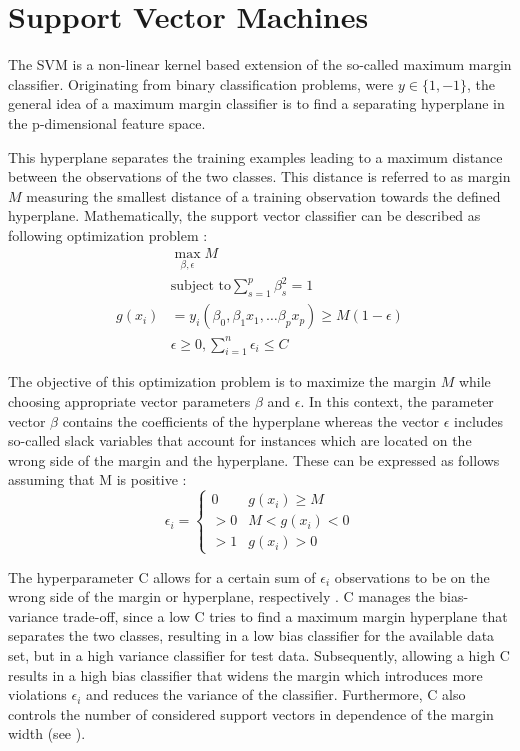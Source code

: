 \section{Support Vector Machines}
The SVM is a non-linear kernel based extension of the so-called maximum margin classifier. Originating from binary classification problems, were $y \in \{1, -1\}$, the general idea of a maximum margin classifier is to find a separating hyperplane in the p-dimensional feature space. 

This hyperplane separates the training examples leading to a maximum distance between the observations of the two classes. This distance is referred to as margin $M$ measuring the smallest distance of a training observation towards the defined hyperplane. Mathematically, the support vector classifier can be described as following optimization problem \cite{James:2014:ISL:2517747}:
\begin{eqnarray}
  & \max_{\beta, \epsilon} M \\
  & \textrm{subject to} \sum_{s=1}^{p} \beta^2_s = 1 \\
  g(x_{i}) &= y_i(\beta_0, \beta_1 x_1, \dots \beta_p x_p) \geq M(1 - \epsilon) \\
  & \epsilon \geq 0, \sum_{i=1}^n \epsilon_i \leq C
\end{eqnarray}

The objective of this optimization problem is to maximize the margin $M$ while choosing appropriate vector parameters $\beta$ and $\epsilon$. In this context, the parameter vector $\beta$ contains the coefficients of the hyperplane whereas the vector $\epsilon$ includes so-called slack variables that account for instances which are located on the wrong side of the margin and the hyperplane. These can be expressed as follows assuming that M is positive \cite{James:2014:ISL:2517747}:
\begin{equation}
  \epsilon_i =
  \begin{cases}
    0 & g(x_i) \geq M \\
    > 0 & M < g(x_i) < 0 \\
    > 1 & g(x_i) > 0 
  \end{cases}
\end{equation}

The hyperparameter C allows for a certain sum of $\epsilon_i$ observations to be on the wrong side of the margin or hyperplane, respectively \cite{James:2014:ISL:2517747}. C manages the bias-variance trade-off, since a low C tries to find a maximum margin hyperplane that separates the two classes, resulting in a low bias classifier for the available data set, but in a high variance classifier for test data. Subsequently, allowing a high C results in a high bias classifier that widens the margin which introduces more violations $\epsilon_i$ and reduces the variance of the classifier. Furthermore, C also controls the number of considered support vectors in dependence of the margin width (see \cite{efron_hastie_2016}).

